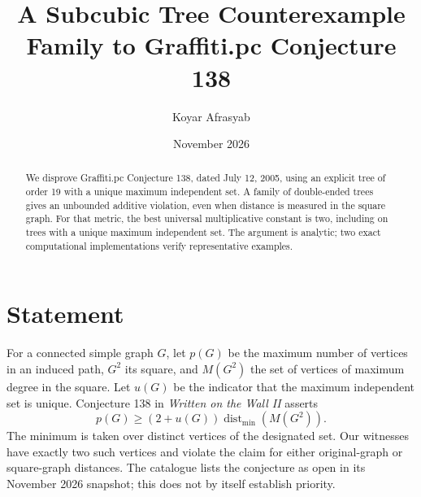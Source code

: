 \documentclass[11pt,a4paper]{article}
\title{A Subcubic Tree Counterexample Family to Graffiti.pc Conjecture 138}
\author{Koyar Afrasyab}
\date{November 2026}
\begin{document}
\maketitle
\begin{abstract}
We disprove Graffiti.pc Conjecture 138, dated July 12, 2005, using an explicit tree of order 19 with a unique maximum independent set. A family of double-ended trees gives an unbounded additive violation, even when distance is measured in the square graph. For that metric, the best universal multiplicative constant is two, including on trees with a unique maximum independent set. The argument is analytic; two exact computational implementations verify representative examples.
\end{abstract}
\section{Statement}
For a connected simple graph $G$, let $p(G)$ be the maximum number of vertices in an induced path, $G^2$ its square, and $M(G^2)$ the set of vertices of maximum degree in the square. Let $u(G)$ be the indicator that the maximum independent set is unique. Conjecture 138 in \emph{Written on the Wall II} \cite{wow} asserts
\[
p(G)\ge (2+u(G))\operatorname{dist}_{\min}(M(G^2)).
\]
The minimum is taken over distinct vertices of the designated set. Our witnesses have exactly two such vertices and violate the claim for either original-graph or square-graph distances. The catalogue lists the conjecture as open in its November 2026 snapshot; this does not by itself establish priority.
\end{document}
